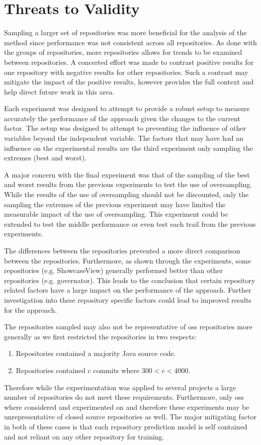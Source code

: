  
\clearpage
\section{Threats to Validity}
\label{sec:threat_validity}


Sampling a larger set of repositories was more beneficial for the analysis of the method since performance was not consistent across all repositories. As done with the groups of repositories, more repositories allows for trends to be examined between repositories. A concerted effort was made to contrast positive results for one repository with negative results for other repositories. Such a contrast may mitigate the impact of the positive results, however provides the full context and help direct future work in this area.

Each experiment was designed to attempt to provide a robust setup to measure accurately the performance of the approach given the changes to the current factor. The setup was designed to attempt to preventing the influence of other variables beyond the independent variable. The factors that may have had an influence on the experimental results are the third experiment only sampling the extremes (best and worst).

A major concern with the final experiment was that of the sampling of the best and worst results from the previous experiments to test the use of oversampling. While the results of the use of oversampling should not be discounted, only the sampling the extremes of the previous experiment may have limited the measurable impact of the use of oversampling. This experiment could be extended to test the middle performance or even test each trail from the previous experiments.

The differences between the repositories prevented a more direct comparison between the repositories. Furthermore, as shown through the experiments, some repositories (e.g. ShowcaseView) generally performed better than other repositories (e.g. governator). This leads to the conclusion that certain repository related factors have a large impact on the performance of the approach. Further investigation into these repository specific factors could lead to improved results for the approach.

The repositories sampled may also not be representative of \gls{oss} repositories more generally as we first restricted the repositories in two respects:
\begin{enumerate}
\item Repositories contained a majority Java source code. 
\item Repositories contained $c$ commits where $300 < c < 4000$.
\end{enumerate}
Therefore while the experimentation was applied to several projects a large number of repositories do not meet these requirements. Furthermore, only \gls{oss} where considered and experimented on and therefore these experiments may be unrepresentative of closed source repositories as well. The major mitigating factor in both of these cases is that each repository prediction model is self contained and not reliant on any other repository for training.